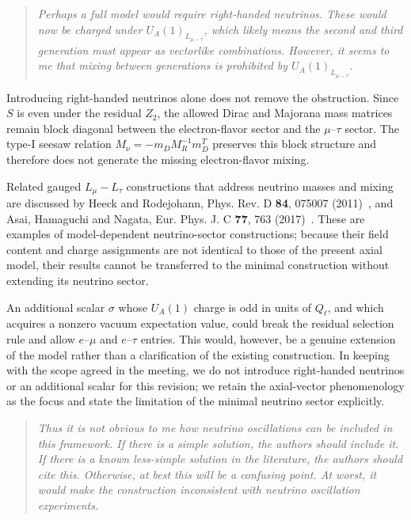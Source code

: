 \documentclass[12pt,a4paper]{article}
\begin{document}
\medskip
{}

\begin{quote}\itshape
Perhaps a full model would require right-handed neutrinos. These would now be charged under \(U_A(1)_{L_{\mu-\tau}}\), which likely means the second and third generation must appear as vectorlike combinations. However, it seems to me that mixing between generations is prohibited by \(U_A(1)_{L_{\mu-\tau}}\).
\end{quote}


Introducing right-handed neutrinos alone does not remove the obstruction. Since \(S\) is even under the residual \(Z_2\), the allowed Dirac and Majorana mass matrices remain block diagonal between the electron-flavor sector and the \(\mu\)--\(\tau\) sector. The type-I seesaw relation \(M_\nu=-m_D M_R^{-1}m_D^T\) preserves this block structure and therefore does not generate the missing electron-flavor mixing.

Related gauged \(L_\mu-L_\tau\) constructions that address neutrino masses and mixing are discussed by Heeck and Rodejohann, Phys. Rev. D \textbf{84}, 075007 (2011)~\cite{Heeck:2011wj}, and Asai, Hamaguchi and Nagata, Eur. Phys. J. C \textbf{77}, 763 (2017)~\cite{Asai:2017ryy}. These are examples of model-dependent neutrino-sector constructions; because their field content and charge assignments are not identical to those of the present axial model, their results cannot be transferred to the minimal construction without extending its neutrino sector.

An additional scalar \(\sigma\) whose \(U_A(1)\) charge is odd in units of \(Q_\ell\), and which acquires a nonzero vacuum expectation value, could break the residual selection rule and allow \(e\)--\(\mu\) and \(e\)--\(\tau\) entries. This would, however, be a genuine extension of the model rather than a clarification of the existing construction. In keeping with the scope agreed in the meeting, we do not introduce right-handed neutrinos or an additional scalar for this revision; we retain the axial-vector phenomenology as the focus and state the limitation of the minimal neutrino sector explicitly.

\medskip
{}

\begin{quote}\itshape
Thus it is not obvious to me how neutrino oscillations can be included in this framework. If there is a simple solution, the authors should include it. If there is a known less-simple solution in the literature, the authors should cite this. Otherwise, at best this will be a confusing point. At worst, it would make the construction inconsistent with neutrino oscillation experiments.
\end{quote}
\end{document}
